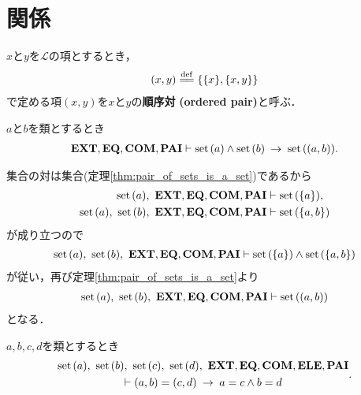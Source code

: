 \section{関係}
	\begin{screen}
		\begin{dfn}[順序対]
			$x$と$y$を$\mathcal{L}$の項とするとき，
			\begin{align}
				(x,y) \defeq \{\{x\},\{x,y\}\}
			\end{align}
			で定める項$(x,y)$を$x$と$y$の{\bf 順序対}
			{\bf (ordered pair)}と呼ぶ．
		\end{dfn}
	\end{screen}
	
	\begin{screen}
		\begin{thm}[集合の順序対は集合]
		\label{thm:ordered_pair_of_sets_is_a_set}
			$a$と$b$を類とするとき
			\begin{align}
				\mbox{{\bf EXT}},\mbox{{\bf EQ}},\mbox{\bf COM},\mbox{{\bf PAI}} \vdash
				\operatorname*{set}\hspace{0.15em}(a) \wedge \operatorname*{set}\hspace{0.15em}(b) \hspace{0.25em}\rightarrow\hspace{0.25em} \operatorname*{set}\hspace{0.15em}((a,b)).
			\end{align}
		\end{thm}
	\end{screen}
	
	\begin{prf}
		集合の対は集合(定理\ref{thm:pair_of_sets_is_a_set})であるから
		\begin{align}
			\operatorname*{set}\hspace{0.15em}(a),\ \mbox{{\bf EXT}},\mbox{{\bf EQ}},\mbox{\bf COM},\mbox{{\bf PAI}} &\vdash \operatorname*{set}\hspace{0.15em}(\{a\}), \\
			\operatorname*{set}\hspace{0.15em}(a),\ \operatorname*{set}\hspace{0.15em}(b),\ \mbox{{\bf EXT}},\mbox{{\bf EQ}},\mbox{\bf COM},\mbox{{\bf PAI}} &\vdash \operatorname*{set}\hspace{0.15em}(\{a,b\})
		\end{align}
		が成り立つので
		\begin{align}
			\operatorname*{set}\hspace{0.15em}(a),\ \operatorname*{set}\hspace{0.15em}(b),\ \mbox{{\bf EXT}},\mbox{{\bf EQ}},\mbox{\bf COM},\mbox{{\bf PAI}} \vdash 
			\operatorname*{set}\hspace{0.15em}(\{a\}) \wedge \operatorname*{set}\hspace{0.15em}(\{a,b\})
		\end{align}
		が従い，再び定理\ref{thm:pair_of_sets_is_a_set}より
		\begin{align}
			\operatorname*{set}\hspace{0.15em}(a),\ \operatorname*{set}\hspace{0.15em}(b),\ \mbox{{\bf EXT}},\mbox{{\bf EQ}},\mbox{\bf COM},\mbox{{\bf PAI}} \vdash \operatorname*{set}\hspace{0.15em}((a,b))
		\end{align}
		となる．
		\QED
	\end{prf}
	
	\begin{screen}
		\begin{thm}[順序対の相等性]
		\label{thm:equality_of_ordered_pairs}
			$a,b,c,d$を類とするとき
			\begin{align}
				\begin{gathered}
					\set{a},\ \set{b},\ \set{c},\ \set{d},\ \EXTAX,\EQAX,\COMAX,\ELEAX,\PAIAX \\
					\vdash (a,b) = (c,d) \rarrow a = c \wedge b = d
				\end{gathered}.
			\end{align}
		\end{thm}
	\end{screen}
	
